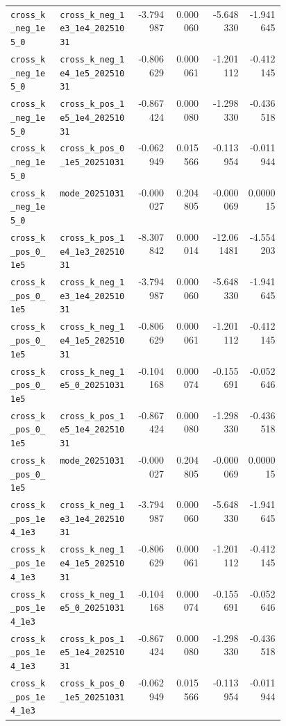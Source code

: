 \documentclass[a4paper,11pt]{jlreq}
\begin{document}
\begin{longtable}{p{0.18\linewidth}p{0.28\linewidth}r r r r}
\texttt{cross\_k\_neg\_1e5\_0}   & \texttt{cross\_k\_neg\_1e3\_1e4\_20251031} & -3.794987 & 0.000060 & -5.648330 & -1.941645 \\
\texttt{cross\_k\_neg\_1e5\_0}   & \texttt{cross\_k\_neg\_1e4\_1e5\_20251031} & -0.806629 & 0.000061 & -1.201112 & -0.412145 \\
\texttt{cross\_k\_neg\_1e5\_0}   & \texttt{cross\_k\_pos\_1e5\_1e4\_20251031} & -0.867424 & 0.000080 & -1.298330 & -0.436518 \\
\texttt{cross\_k\_neg\_1e5\_0}   & \texttt{cross\_k\_pos\_0\_1e5\_20251031}   & -0.062949 & 0.015566 & -0.113954 & -0.011944 \\
\texttt{cross\_k\_neg\_1e5\_0}   & \texttt{mode\_20251031}                    & -0.000027 & 0.204805 & -0.000069 &  0.000015 \\
\texttt{cross\_k\_pos\_0\_1e5}   & \texttt{cross\_k\_pos\_1e4\_1e3\_20251031} & -8.307842 & 0.000014 & -12.061481 & -4.554203 \\
\texttt{cross\_k\_pos\_0\_1e5}   & \texttt{cross\_k\_neg\_1e3\_1e4\_20251031} & -3.794987 & 0.000060 & -5.648330 & -1.941645 \\
\texttt{cross\_k\_pos\_0\_1e5}   & \texttt{cross\_k\_neg\_1e4\_1e5\_20251031} & -0.806629 & 0.000061 & -1.201112 & -0.412145 \\
\texttt{cross\_k\_pos\_0\_1e5}   & \texttt{cross\_k\_neg\_1e5\_0\_20251031}   & -0.104168 & 0.000074 & -0.155691 & -0.052646 \\
\texttt{cross\_k\_pos\_0\_1e5}   & \texttt{cross\_k\_pos\_1e5\_1e4\_20251031} & -0.867424 & 0.000080 & -1.298330 & -0.436518 \\
\texttt{cross\_k\_pos\_0\_1e5}   & \texttt{mode\_20251031}                    & -0.000027 & 0.204805 & -0.000069 &  0.000015 \\
\texttt{cross\_k\_pos\_1e4\_1e3} & \texttt{cross\_k\_neg\_1e3\_1e4\_20251031} & -3.794987 & 0.000060 & -5.648330 & -1.941645 \\
\texttt{cross\_k\_pos\_1e4\_1e3} & \texttt{cross\_k\_neg\_1e4\_1e5\_20251031} & -0.806629 & 0.000061 & -1.201112 & -0.412145 \\
\texttt{cross\_k\_pos\_1e4\_1e3} & \texttt{cross\_k\_neg\_1e5\_0\_20251031}   & -0.104168 & 0.000074 & -0.155691 & -0.052646 \\
\texttt{cross\_k\_pos\_1e4\_1e3} & \texttt{cross\_k\_pos\_1e5\_1e4\_20251031} & -0.867424 & 0.000080 & -1.298330 & -0.436518 \\
\texttt{cross\_k\_pos\_1e4\_1e3} & \texttt{cross\_k\_pos\_0\_1e5\_20251031}   & -0.062949 & 0.015566 & -0.113954 & -0.011944 \\

\end{longtable}
\end{document}

